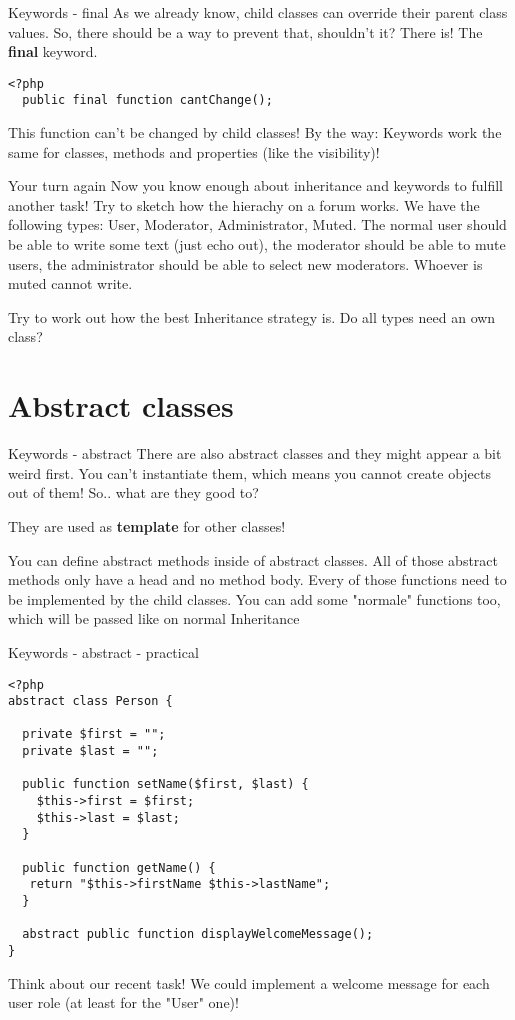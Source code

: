 \begin{frame}[fragile]{Keywords - final}
	As we already know, child classes can override their parent class values. So, there should be a way to prevent that, shouldn't it? \pause
	There is! The \textbf{final} keyword.
	\begin{lstlisting}
<?php
  public final function cantChange();
    \end{lstlisting}
    \pause
    This function can't be changed by child classes!
    By the way: Keywords work the same for classes, methods and properties (like the visibility)!
\end{frame}


\begin{frame}[fragile]{Your turn again}
	Now you know enough about inheritance and keywords to fulfill another task! \pause Try to sketch how the hierachy on a forum works. We have the following types: User, Moderator, Administrator, Muted. The normal user should be able to write some text (just echo out), the moderator should be able to mute users, the administrator should be able to select new moderators. Whoever is muted cannot write.\pause
	
	Try to work out how the best Inheritance strategy is. \pause Do all types need an own class?
\end{frame}

\section{Abstract classes}

\begin{frame}[fragile]{Keywords - abstract}
	There are also abstract classes and they might appear a bit weird first. You can't instantiate them, which means you cannot create objects out of them!
	So.. what are they good to?\pause
	
	They are used as \textbf{template} for other classes! 
	
	You can define abstract methods inside of abstract classes. All of those abstract methods only have a head and no method body. Every of those functions need to be implemented by the child classes. You can add some "normale" functions too, which will be passed like on normal Inheritance
\end{frame}

\begin{frame}[fragile]{Keywords - abstract - practical}
	\begin{lstlisting}
<?php
abstract class Person {
 
  private $first = ""; 
  private $last = "";
 
  public function setName($first, $last) {
    $this->first = $first;
    $this->last = $last;
  }
 
  public function getName() {
   return "$this->firstName $this->lastName";
  }
   
  abstract public function displayWelcomeMessage();
}
	\end{lstlisting}
	\pause
	Think about our recent task! We could implement a welcome message for each user role (at least for the "User" one)!
\end{frame}

